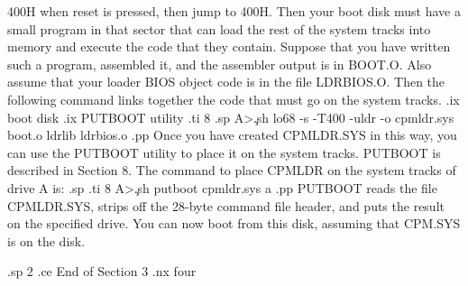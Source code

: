 400H when reset is pressed, then jump to 400H.  Then your boot disk must
have a small program in that sector that can load the rest of the system 
tracks into memory and execute the code that they contain.  Suppose that you
have written such a program, assembled it, and the assembler output is in 
BOOT.O.  Also assume that your loader BIOS object code is in the file
LDRBIOS.O.  Then the following command links together the code that must
go on the system tracks.
.ix boot disk
.ix PUTBOOT utility
.ti 8
.sp
A>\c
.sh
lo68 -s -T400 -uldr -o cpmldr.sys boot.o ldrlib ldrbios.o
.pp
Once you have created CPMLDR.SYS in this way, you can use the PUTBOOT utility
to place it on the system tracks.  PUTBOOT is described in Section 8.
The command to place CPMLDR on the system tracks of drive A is:
.sp
.ti 8
A>\c
.sh
putboot cpmldr.sys a
.pp
PUTBOOT reads the file CPMLDR.SYS, strips off the 28-byte command file 
header, and puts the result on the specified drive.  You can now boot from 
this disk, assuming that CPM.SYS is on the disk.

.sp 2
.ce
End of Section 3
.nx four
